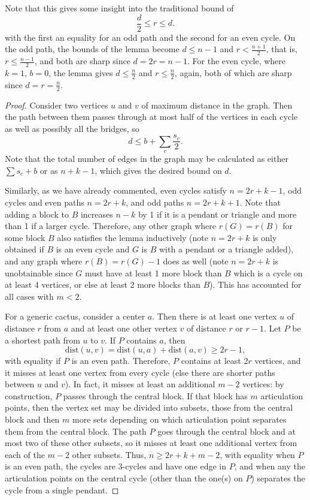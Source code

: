 \documentclass{amsart}
\theoremstyle{definition}
\newcommand{\dist}{\text{dist}}
\begin{document}
Note that this gives some insight into the traditional bound of 
\[\frac{d}{2} \leq r \leq d.\]
with the first an equality for an odd path and the second for an even cycle. On the odd path, the bounds of the lemma become $d \leq n-1$ and $r < \frac{n+1}{2}$, that is, $r \leq \frac{n-1}{2}$, and both are sharp since $d = 2r = n-1$. For the even cycle, where $k=1$, $b=0$, the lemma gives $d \leq \frac{n}{2}$ and $r \leq \frac{n}{2}$, again, both of which are sharp since $d = r = \frac{n}{2}$. 

\begin{proof}%
Consider two vertices $u$ and $v$ of maximum distance in the graph. Then the path between them passes through at most half of the vertices in each cycle as well as possibly all the bridges, so
\[d \leq b + \sum_c \frac{s_c}{2}.\]
Note that the total number of edges in the graph may be calculated as either $\sum s_c + b$ or as $n+k-1$, which gives the desired bound on $d$.

Similarly, as we have already commented, even cycles satisfy $n= 2r + k - 1$, odd cycles and even paths $n = 2r + k$, and odd paths $n = 2r + k + 1$. Note that adding a block to $B$ increases $n-k$ by 1 if it is a pendant or triangle and more than 1 if a larger cycle. Therefore, any other graph where $r(G) = r(B)$ for some block $B$ also satisfies the lemma inductively (note $n = 2r + k$ is only obtained if $B$ is an even cycle and $G$ is $B$ with a pendant or a triangle added), and any graph where $r(B) = r(G) - 1$ does as well (note $n = 2r + k$ is unobtainable since $G$ must have at least 1 more block than $B$ which is a cycle on at least 4 vertices, or else at least 2 more blocks than $B$). This has accounted for all cases with $m < 2$. 

For a generic cactus, consider a center $a$. Then there is at least one vertex $u$ of distance $r$ from $a$ and at least one other vertex $v$ of distance $r$ or $r-1$. Let $P$ be a shortest path from $u$ to $v$. If $P$ contains $a$, then 
\[\dist(u,v) = \dist(u,a)+\dist(a,v) \geq 2r-1,\]
 with equality if $P$ is an even path. Therefore, $P$ contains at least $2r$ vertices, and it misses at least one vertex from every cycle (else there are shorter paths between $u$ and $v$). In fact, it misses at least an additional $m-2$ vertices: by construction, $P$ passes through the central block. If that block has $m$ articulation points, then the vertex set may be divided into subsets, those from the central block and then $m$ more sets depending on which articulation point separates them from the central block. The path $P$ goes through the central block and at most two of these other subsets, so it misses at least one additional vertex from each of the $m-2$ other subsets. Thus, $n \geq 2r + k + m - 2$, with equality when $P$ is an even path, the cycles are 3-cycles and have one edge in $P$, and when any the articulation points on the central cycle (other than the one(s) on $P$) separates the cycle from a single pendant.


\end{proof}
\end{document}
